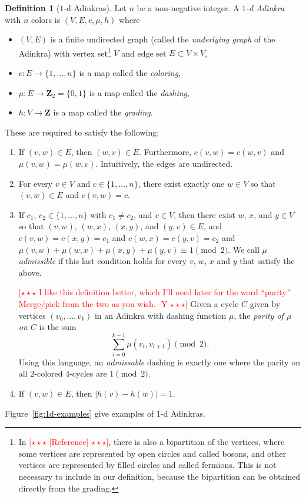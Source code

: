 \documentclass[12pt,twoside,singlespace]{article}
\numberwithin{equation}{section}
\theoremstyle{definition}
\newtheorem{definition}[equation]{Definition}
\newcommand{\ZZ}{\mathbf{Z}}
\newcommand{\com}[1]{\textcolor{red}{$[\star \star \star$ #1 $\star \star \star]$}}
\begin{document}
\begin{definition}[$1$-d Adinkras]
Let $n$ be a non-negative integer.  A \emph{$1$-d Adinkra} with $n$ colors is $(V,E,c,\mu,h)$ where
\begin{itemize}
\item $(V,E)$ is a finite undirected graph (called the \emph{underlying graph} of the Adinkra) with vertex set\footnote{In \com{[Reference]}, there is also a bipartition of the vertices, where some vertices are represented by open circles and called bosons, and other vertices are represented by filled circles and called fermions.  This is not necessary to include in our definition, because the bipartition can be obtained directly from the grading.}
 $V$ and edge set $E\subset V\times V$,
\item $c:E\to \{1,\ldots,n\}$ is a map called the \emph{coloring},
\item $\mu:E\to \ZZ_2=\{0,1\}$ is a map called the \emph{dashing},
\item $h:V\to\ZZ$ is a map called the \emph{grading}.
\end{itemize}

These are required to satisfy the following:
\begin{enumerate}
\item If $(v,w)\in E$, then $(w,v)\in E$.  Furthermore, $c(v,w)=c(w,v)$ and $\mu(v,w)=\mu(w,v)$.  Intuitively, the edges are undirected.
\item For every $v\in V$ and $c\in \{1,\ldots,n\}$, there exist exactly one $w\in V$ so that $(v,w)\in E$ and $c(v,w)=c$.
\item If $c_1$, $c_2\in \{1,\ldots,n\}$ with $c_1\not=c_2$, and $v\in V$, then there exist $w$, $x$, and $y\in V$ so that $(v,w)$, $(w,x)$, $(x,y)$, and $(y,v)\in E$, and $c(v,w)=c(x,y)=c_1$ and $c(w,x)=c(y,v)=c_2$ and $\mu(v,w)+\mu(w,x)+\mu(x,y)+\mu(y,v)\equiv 1\pmod{2}$.  We call $\mu$ \emph{admissible} if this last condition holds for every $v$, $w$, $x$ and $y$ that satisfy the above.

\com{ I like this definition better, which I'll need later for the word ``parity.'' Merge/pick from the two as you wish. -Y}
 Given a cycle $C$ given by vertices $(v_0,\ldots,v_k)$ in an Adinkra with dashing function $\mu$, the \emph{parity of $\mu$ on $C$} is the sum
\[\sum_{i=0}^{k-1} \mu(v_i,v_{i+1})\pmod{2}.\]
Using this language, an \emph{admissable} dashing is exactly one where the parity on all $2$-colored $4$-cycles are $1 \pmod{2}$.

\item If $(v,w)\in E$, then $|h(v)-h(w)|=1$.
\end{enumerate}

Figure~\ref{fig:1d-examples} give examples of 1-d Adinkras.
\end{definition}
\end{document}
